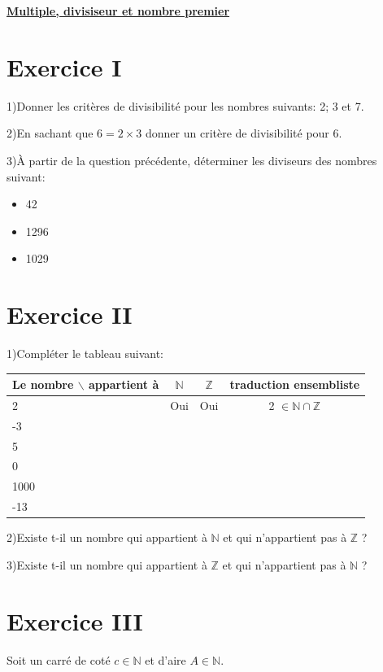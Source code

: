\documentclass[french]{article}
\begin{document}
\twocolumn
\begin{center}
\underline{\textbf{Multiple, divisiseur et nombre premier}}
\end{center}
\section*{Exercice I}
1)Donner les critères de divisibilité pour les nombres suivants: 
2; 3 et 7.

2)En sachant que $6=2\times 3$ donner un critère de divisibilité pour $6$.


3)À partir de la question précédente, déterminer les diviseurs des nombres suivant:
\begin{itemize}
\item[$\bullet$]42
\item[$\bullet$]1296 %
\item[$\bullet$]1029 %
\end{itemize}

\section*{Exercice II}
1)Compléter le tableau suivant:

\begin{tabular}[scale=1]{|l|c|c|c|} 
\hline
Le nombre $\backslash$ appartient à & $\mathbb{N}$ & $\mathbb{Z}$ & traduction ensembliste \\
\hline
2 & Oui   & Oui & 2 $\in \mathbb{N}\cap\mathbb{Z}$  \\
\hline
-3 &  &  &  \\
\hline
5 &  &  &  \\
\hline
0 &  &  &  \\
\hline
1000 &  &  &  \\
\hline
-13 &  &  &  \\
\hline
\end{tabular}

2)Existe t-il un nombre qui appartient à $\mathbb{N}$ et qui n'appartient pas à $\mathbb{Z}$ ?

3)Existe t-il un nombre qui appartient à $\mathbb{Z}$ et qui n'appartient pas à $\mathbb{N}$ ?

\section*{Exercice III}
Soit un carré de coté $c \in \mathbb{N}$ et d'aire $A \in \mathbb{N}$.\\
\end{document}
